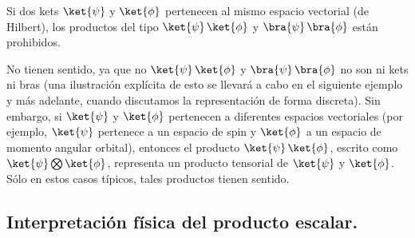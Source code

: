 \begin{enumerate}[label=\alph*)]
Si dos kets $\ket{\psi}$ y $\ket{\phi}$ pertenecen al mismo espacio vectorial (de Hilbert), los productos del tipo $\ket{\psi} \, \ket{\phi}$ y $\bra{\psi} \, \bra{\phi}$ están prohibidos.
\par
No tienen sentido, ya que no $\ket{\psi} \, \ket{\phi}$ y $\bra{\psi} \, \bra{\phi}$ no son ni kets ni bras (una ilustración explícita de esto se llevará a cabo en el siguiente ejemplo y más adelante, cuando discutamos la representación de forma discreta). Sin embargo, si $\ket{\psi}$ y $\ket{\phi}$ pertenecen a diferentes espacios vectoriales (por ejemplo, $\ket{\psi}$ pertenece a un espacio de spin y $\ket{\phi}$ a un espacio de momento angular orbital), entonces el producto $\ket{\psi} \, \ket{\phi}$, escrito como $\ket{\psi} \bigotimes \ket{\phi}$, representa un producto tensorial de $\ket{\psi}$ y $\ket{\phi}$. Sólo en estos casos típicos, tales productos tienen sentido.
\end{enumerate}

\subsection{Interpretación física del producto escalar.}


